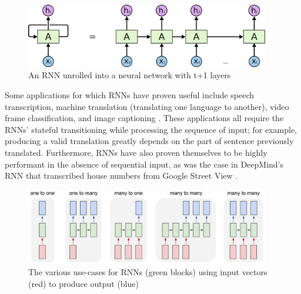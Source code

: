 \begin{figure}[h]
\centering
\captionsetup{justification=centering,width=0.95\textwidth}
\centerline{\includegraphics[width=0.95\textwidth]{rnnUnrolled.png}}
\caption[Unrolled RNN]{
    An RNN unrolled into a neural network with t+1 layers \cite{rnnUnrolled}
}
\label{fig:rnnUnrolled}
\end{figure}


Some applications for which RNNs have proven useful include speech transcription, machine translation (translating one language to another), video frame classification, and image captioning \cite{rnn}.  These applications all require the RNNs' stateful transitioning while processing the sequence of input; for example, producing a valid translation greatly depends on the part of sentence previously translated.  Furthermore, RNNs have also proven themselves to be highly performant in the absence of sequential input, as was the case in DeepMind's RNN that transcribed house numbers from Google Street View \cite{deepMindHouseNumber}.


\begin{figure}[h]
\centering
\captionsetup{justification=centering,width=0.95\textwidth}
\centerline{\includegraphics[width=0.95\textwidth]{rnnTransformations.png}}
\caption[Various RNN Setups]{
    The various use-cases for RNNs (green blocks) using input vectors (red) to produce output (blue) \cite{rnnTransformations}
}
\label{fig:rnnTransformations}
\end{figure}


